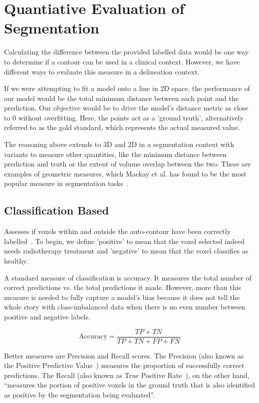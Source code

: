 \documentclass[11pt,twoside]{report}
\begin{document}
\chapter{Quantiative Evaluation of Segmentation}\label{sect:performance-evaluation}

Calculating the difference between the provided labelled data would be one way to determine if a contour can be used in a clinical context. However, we have different ways to evaluate this measure in a delineation context.

If we were attempting to fit a model onto a line in 2D space, the performance of our model would be the total minimum distance between each point and the prediction. Our objective would be to drive the model's distance metric as close to 0 without overfitting. Here, the points act as a 'ground truth', alternatively referred to as the gold standard, which represents the actual measured value.

The reasoning above extends to 3D and 2D in a segmentation context with variants to measure other quantities, like the minimum distance between prediction and truth or the extent of volume overlap between the two. These are examples of geometric measures, which Mackay et al. has found to be the most popular measure in segmentation tasks~\cite{review-metrics}.

\section{Classification Based}\label{sect:classification-based}

Assesses if voxels within and outside the auto-contour have been correctly labelled~\cite{review-metrics}. To begin, we define 'positive' to mean that the voxel selected indeed needs radiotherapy treatment and 'negative' to mean that the voxel classifies as healthy.

A standard measure of classification is accuracy. It measures the total number of correct predictions vs. the total predictions it made. However, more than this measure is needed to fully capture a model's bias because it does not tell the whole story with class-imbalanced data when there is no even number between positive and negative labels.

\begin{equation*}
 \text{Accuracy} = \frac{TP + TN}{TP + TN + FP + FN}
\end{equation*}

Better measures are Precision and Recall scores. The Precision (also known as the Positive Predictive Value~\cite{evaluation-metrics}) measures the proportion of successfully correct predictions. The Recall (also known as True Positive Rate~\cite{evaluation-metrics}), on the other hand, ``measures the portion of positive voxels in the ground truth that is also identified as positive by the segmentation being evaluated''.
\end{document}
